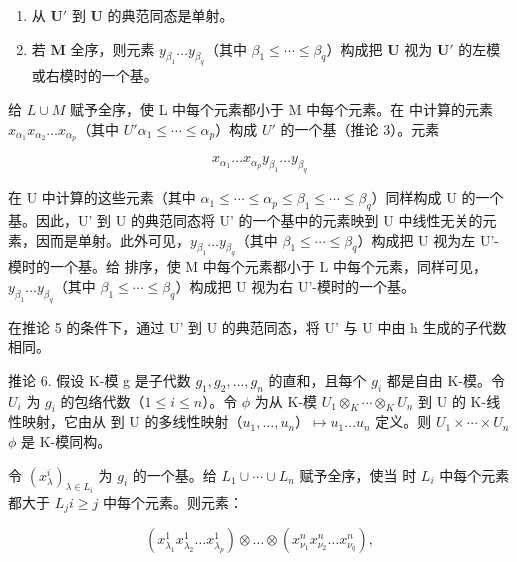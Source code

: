 \begin{enumerate}
\def\labelenumi{(\alph{enumi})}
\item
  从 \(\mathbf{U}'\) 到 \(\mathbf{U}\) 的典范同态是单射。
\item
  若 \(\mathbf{M}\) 全序，则元素 \(y_{\beta_1} \ldots y_{\beta_q}\)（其中 \(\beta_1 \leqslant \cdots \leqslant \beta_q\)）构成把 \(\mathbf{U}\) 视为 \(\mathbf{U}'\) 的左模或右模时的一个基。
\end{enumerate}

给 \(L \cup M\) 赋予全序，使 L 中每个元素都小于 M 中每个元素。在  中计算的元素 \(x_{\alpha_{1}}x_{\alpha_{2}}\ldots x_{\alpha_{p}}\)（其中 \(U'\)\(\alpha_{1} \leqslant \cdots \leqslant \alpha_{p}\)）构成 \(U'\) 的一个基（推论 3）。元素

\[
x _ {\alpha_ {1}} \dots x _ {\alpha_ {p}} y _ {\beta_ {1}} \dots y _ {\beta_ {q}}
\]

在 U 中计算的这些元素（其中 \(\alpha_{1} \leqslant \cdots \leqslant \alpha_{p} \leqslant \beta_{1} \leqslant \cdots \leqslant \beta_{q}\)）同样构成 U 的一个基。因此，U' 到 U 的典范同态将 U' 的一个基中的元素映到 U 中线性无关的元素，因而是单射。此外可见，\(y_{\beta_1} \ldots y_{\beta_q}\)（其中 \(\beta_{1} \leqslant \cdots \leqslant \beta_{q}\)）构成把 U 视为左 U'-模时的一个基。给  排序，使 M 中每个元素都小于 L 中每个元素，同样可见，\(y_{\beta_1} \ldots y_{\beta_q}\)（其中 \(\beta_{1} \leqslant \cdots \leqslant \beta_{q}\)）构成把 U 视为右 U'-模时的一个基。

在推论 5 的条件下，通过 U' 到 U 的典范同态，将 U' 与 U 中由 h 生成的子代数相同。

推论 6. 假设 K-模 g 是子代数 \(g_{1}, g_{2}, \ldots, g_{n}\) 的直和，且每个 \(g_{i}\) 都是自由 K-模。令 \(U_{i}\) 为 \(g_{i}\) 的包络代数（\(1 \leqslant i \leqslant n\)）。令 \(\phi\) 为从 K-模 \(U_{1} \otimes_{K} \cdots \otimes_{K} U_{n}\) 到 U 的 K-线性映射，它由从  到 U 的多线性映射（\(u_{1}, \ldots, u_{n}\)）\(\mapsto u_{1} \ldots u_{n}\) 定义。则 \(U_{1} \times \cdots \times U_{n}\)\(\phi\) 是 K-模同构。

令 \((x_{\lambda}^{i})_{\lambda \in L_{i}}\) 为 \(g_{i}\) 的一个基。给 \(L_{1} \cup \cdots \cup L_{n}\) 赋予全序，使当  时 \(L_{i}\) 中每个元素都大于 \(L_{j}\)\(i \geqslant j\) 中每个元素。则元素：

\[
\left(x _ {\lambda_ {1}} ^ {1} x _ {\lambda_ {2}} ^ {1} \dots x _ {\lambda_ {p}} ^ {1}\right) \otimes \dots \otimes \left(x _ {\nu _ {1}} ^ {n} x _ {\nu _ {2}} ^ {n} \dots x _ {\nu _ {q}} ^ {n}\right),
\]

